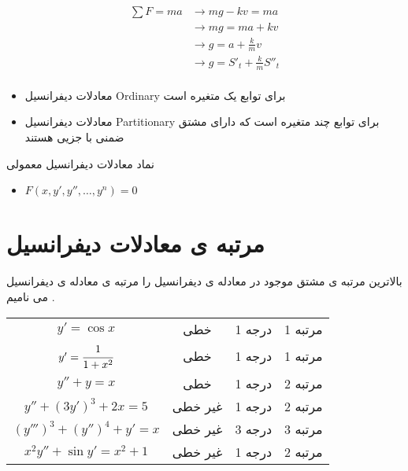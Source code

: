 \documentclass[12pt]{book}
\begin{document}


\begin{align*}
\sum{F} = ma  &\to mg - kv = ma \\
 &\to mg = ma + kv \\
 &\to g = a + \frac{k}{m}v \\
 &\to g = S'_{t} + \frac{k}{m} S''_{t} \\
\end{align*}



\begin{tcolorbox}
\begin{itemize}
	\item معادلات دیفرانسیل Ordinary برای 
	توابع یک متغیره است
	\item معادلات دیفرانسیل Partitionary
	برای توابع چند متغیره است که دارای مشتق ضمنی با جزیی هستند
\end{itemize}
\end{tcolorbox}



\begin{tcolorbox}
نماد معادلات دیفرانسیل معمولی
\begin{itemize}
	\item $F ( x , y' , y'' , \dots , y^{n} ) = 0$
\end{itemize}
\end{tcolorbox}


\newpage

\section{مرتبه ی معادلات دیفرانسیل}

بالاترین مرتبه ی مشتق موجود در معادله ی دیفرانسیل را مرتبه ی معادله ی دیفرانسیل می نامیم .


\begin{center}
  \bgroup
  \def\arraystretch{1.5}%
  \begin{tabular}{  c | c | c | c }
    $y' = \cos{x}$ & خطی
     & درجه 1
      & مرتبه 1  \\ 
    $y' = \cfrac{1}{1+x^{2}}$ & خطی
     & درجه 1
      & مرتبه 1 \\ 
    $y'' + y = x$ & خطی
     & درجه 1
      & مرتبه 2 \\ 
    $y'' + (3y')^{3} + 2x = 5$ & غیر خطی
     & درجه 1
      & مرتبه 2 \\
    $(y''')^{3} + (y'')^{4} + y' = x$ & غیر خطی
     & درجه 3
      & مرتبه 3 \\
    $x^{2}y'' + \sin{y'} = x^{2} + 1$ & غیر خطی
     & درجه 1
      & مرتبه 2 \\
  \end{tabular}
  \egroup
\end{center}
\end{document}
